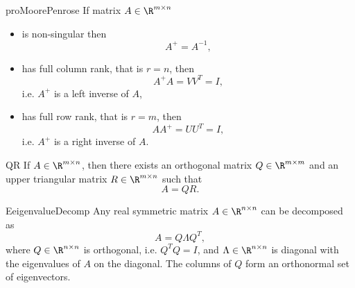 \begin{pro}{proMoorePenrose}
    If matrix $A \in \R^{m \times n}$ 
    \begin{itemize}
        \item 
            is non-singular then 
            \begin{equation*}
                A^+ = A^{-1},
            \end{equation*}
        \item 
            has full column rank, that is $r = n$, then 
            \begin{equation*}
                A^+A = VV^T = I,
            \end{equation*}
            i\@.e\@. $A^+$ is a left inverse of $A$,
        \item 
            has full row rank, that is $r = m$, then 
            \begin{equation*}
                AA^+ = UU^T = I,
            \end{equation*}
            i\@.e\@. $A^+$ is a right inverse of $A$.
    \end{itemize}
\end{pro}

\begin{theo}{QR}
    If $A \in \R^{m \times n}$, then there exists an orthogonal matrix $Q \in \R^{m \times m}$ and an upper triangular matrix $R \in \R^{m \times n}$ such that
    \begin{equation*}
        A = QR.
    \end{equation*}
    \vspace{-0.5cm}
\end{theo}

\newpage

\begin{theo}{EeigenvalueDecomp}
    Any real symmetric matrix $A \in \R^{n \times n}$ can be decomposed as
    \begin{equation*}
        A = Q \Lambda Q^T,
    \end{equation*}
    where $Q \in \R^{n \times n}$ is orthogonal, i\@.e\@. $Q^T Q = I$, and $\Lambda \in \R^{n \times n}$ is diagonal with the eigenvalues of $A$ on the diagonal. The columns of $Q$ form an orthonormal set of eigenvectors.
\end{theo}

